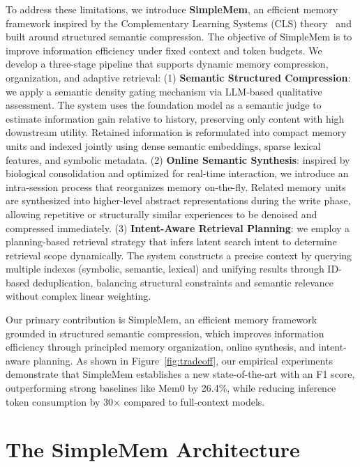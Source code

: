 \documentclass{article}
\theoremstyle{plain}
\theoremstyle{definition}
\theoremstyle{remark}
\begin{document}
To address these limitations, we introduce \textbf{SimpleMem}, an efficient memory framework inspired by the Complementary Learning Systems (CLS) theory~\cite{kumaran2016learning} and built around structured semantic compression.
The objective of SimpleMem is to improve information efficiency under fixed context and token budgets. We develop a three-stage pipeline that supports dynamic memory compression, organization, and adaptive retrieval:
(1) \textbf{Semantic Structured Compression}: we apply a {semantic density gating} mechanism via {LLM-based qualitative assessment}. The system uses the foundation model as a semantic judge to estimate information gain relative to history, preserving only content with high downstream utility. Retained information is reformulated into compact memory units and indexed jointly using dense semantic embeddings, sparse lexical features, and symbolic metadata.
(2) \textbf{Online Semantic Synthesis}: inspired by biological consolidation and optimized for real-time interaction, we introduce an {intra-session} process that reorganizes memory on-the-fly. Related memory units are synthesized into higher-level abstract representations during the write phase, allowing repetitive or structurally similar experiences to be denoised and compressed immediately.
(3) \textbf{Intent-Aware Retrieval Planning}: we employ a planning-based retrieval strategy that infers {latent search intent} to determine retrieval scope dynamically. The system constructs a precise context by querying multiple indexes (symbolic, semantic, lexical) and unifying results through ID-based deduplication, balancing structural constraints and semantic relevance without complex linear weighting.

Our primary contribution is SimpleMem, an efficient memory framework grounded in structured semantic compression, which improves information efficiency through principled memory organization, online synthesis, and intent-aware planning.
As shown in Figure~\ref{fig:tradeoff}, our empirical experiments demonstrate that SimpleMem establishes a new state-of-the-art with an F1 score, outperforming strong baselines like Mem0 by 26.4\%, while reducing inference token consumption by 30$\times$ compared to full-context models.


\section{The SimpleMem Architecture}
\label{sec:methodology}
\end{document}
